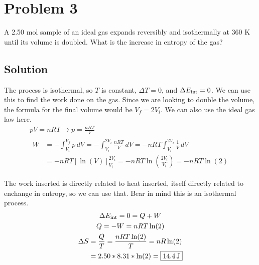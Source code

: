 \documentclass[12pt]{article}
\begin{document}
    \pagebreak
    \section{Problem 3}
        A 2.50 mol sample of an ideal gas expands reversibly and isothermally at 360 K until its volume is doubled. 
        What is the increase in entropy of the gas?

        \subsection{Solution}
            The process is isothermal, so $T$ is constant, $\Delta T = 0$, and $\Delta E_{\rm int} = 0$.
            We can use this to find the work done on the gas.
            Since we are looking to double the volume, the formula for the final volume would be $V_f = 2V_i$.
            We can also use the ideal gas law here.
            \begin{gather}
                pV  =   nRT \to p = \frac{nRT}{V}\\
                \begin{align}
                    W   &=  -\int_{V_i}^{V_f} p\,dV
                        =   -\int_{V_i}^{2V_i} \frac{nRT}{V}\,dV
                        =   -nRT\int_{V_i}^{2V_i} \frac{1}{V}\,dV\\
                        &=  -nRT\left[ \ln(V) \right]_{V_i}^{2V_i}
                        =   -nRT\ln\left( \frac{2V_i}{V_i} \right)
                        =   -nRT\ln(2)
                \end{align}
            \end{gather}

            The work inserted is directly related to heat inserted, itself directly related to enchange in entropy, so we can use that.
            Bear in mind this is an isothermal process.
            \begin{gather}
                \Delta E_{\rm int}  =   0
                    =   Q + W\\
                Q   =   -W
                    =   nRT\ln(2)\\
                \begin{align}
                    \Delta S    &=  \frac{Q}{T}
                        =   \frac{nRT\ln(2)}{T}
                        =   nR\ln(2)\\
                        &=  2.50 * 8.31 * \ln(2)
                        =   \boxed{14.4\,\unit{\joule}}
                \end{align}
            \end{gather}
\end{document}

